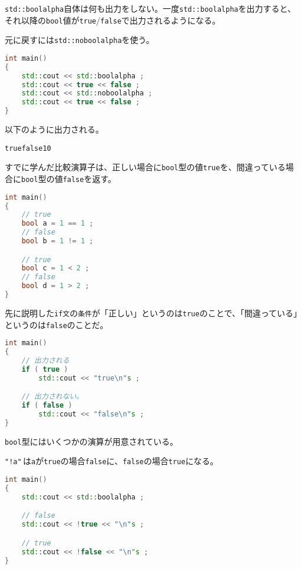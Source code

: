 \texttt{std::boolalpha}自体は何も出力をしない。一度\texttt{std::boolalpha}を出力すると、それ以降の\texttt{bool}値が\texttt{true}/\texttt{false}で出力されるようになる。

元に戻すには\texttt{std::noboolalpha}を使う。

\begin{lstlisting}[language={C++}]
int main()
{
    std::cout << std::boolalpha ;
    std::cout << true << false ;
    std::cout << std::noboolalpha ;
    std::cout << true << false ;
}
\end{lstlisting}

以下のように出力される。

\begin{lstlisting}[style=terminal]
truefalse10
\end{lstlisting}

すでに学んだ比較演算子は、正しい場合に\texttt{bool}型の値\texttt{true}を、間違っている場合に\texttt{bool}型の値\texttt{false}を返す。

\begin{lstlisting}[language={C++}]
int main()
{
    // true
    bool a = 1 == 1 ;
    // false
    bool b = 1 != 1 ;

    // true
    bool c = 1 < 2 ;
    // false
    bool d = 1 > 2 ;
}
\end{lstlisting}

先に説明した\texttt{if文}の\texttt{条件}が「正しい」というのは\texttt{true}のことで、「間違っている」というのは\texttt{false}のことだ。

\begin{lstlisting}[language={C++}]
int main()
{
    // 出力される
    if ( true )
        std::cout << "true\n"s ;

    // 出力されない。
    if ( false )
        std::cout << "false\n"s ; 
}
\end{lstlisting}


\texttt{bool}型にはいくつかの演算が用意されている。


\texttt{"!a"}\,は\texttt{a}が\texttt{true}の場合\texttt{false}に、\texttt{false}の場合\texttt{true}になる。

\begin{lstlisting}[language={C++}]
int main()
{
    std::cout << std::boolalpha ;

    // false
    std::cout << !true << "\n"s ;

    // true
    std::cout << !false << "\n"s ;
}
\end{lstlisting}

